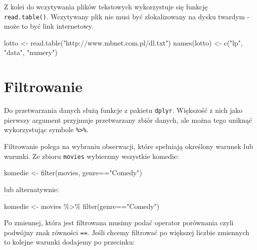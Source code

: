 \documentclass[
  letterpaper,
  DIV=11,
  numbers=noendperiod]{scrreprt}
\newenvironment{Shaded}{\begin{snugshade}}{\end{snugshade}}
\newcommand{\FunctionTok}[1]{\textcolor[rgb]{0.28,0.35,0.67}{#1}}
\newcommand{\NormalTok}[1]{\textcolor[rgb]{0.00,0.23,0.31}{#1}}
\newcommand{\OtherTok}[1]{\textcolor[rgb]{0.00,0.23,0.31}{#1}}
\newcommand{\SpecialCharTok}[1]{\textcolor[rgb]{0.37,0.37,0.37}{#1}}
\newcommand{\StringTok}[1]{\textcolor[rgb]{0.13,0.47,0.30}{#1}}
\begin{document}
Z kolei do wczytywania plików tekstowych wykorzystuje się funkcję
\texttt{read.table()}. Wczytywany plik nie musi być zlokalizowany na
dysku twardym - może to być link internetowy.

\begin{Shaded}
\begin{Highlighting}[]
\NormalTok{lotto }\OtherTok{\textless{}{-}} \FunctionTok{read.table}\NormalTok{(}\StringTok{"http://www.mbnet.com.pl/dl.txt"}\NormalTok{)}
\FunctionTok{names}\NormalTok{(lotto) }\OtherTok{\textless{}{-}} \FunctionTok{c}\NormalTok{(}\StringTok{"lp"}\NormalTok{, }\StringTok{"data"}\NormalTok{, }\StringTok{"numery"}\NormalTok{)}
\end{Highlighting}
\end{Shaded}

\hypertarget{filtrowanie}{%
\section{Filtrowanie}\label{filtrowanie}}

Do przetwarzania danych służą funkcje z pakietu \texttt{dplyr}.
Większość z nich jako pierwszy argument przyjmuje przetwarzany zbiór
danych, ale można tego uniknąć wykorzystując symbole
\texttt{\%\textgreater{}\%}.

Filtrowanie polega na wybraniu obserwacji, które spełniają określony
warunek lub warunki. Ze zbioru \texttt{movies} wybierzmy wszystkie
komedie:

\begin{Shaded}
\begin{Highlighting}[]
\NormalTok{komedie }\OtherTok{\textless{}{-}} \FunctionTok{filter}\NormalTok{(movies, genre}\SpecialCharTok{==}\StringTok{"Comedy"}\NormalTok{)}
\end{Highlighting}
\end{Shaded}

lub alternatywnie:

\begin{Shaded}
\begin{Highlighting}[]
\NormalTok{komedie }\OtherTok{\textless{}{-}}\NormalTok{ movies }\SpecialCharTok{\%\textgreater{}\%}
  \FunctionTok{filter}\NormalTok{(genre}\SpecialCharTok{==}\StringTok{"Comedy"}\NormalTok{)}
\end{Highlighting}
\end{Shaded}

Po zmiennej, która jest filtrowana musimy podać operator porównania
czyli podwójny znak równości \texttt{==}. Jeśli chcemy filtrować po
większej liczbie zmiennych to kolejne warunki dodajemy po przecinku:
\end{document}
